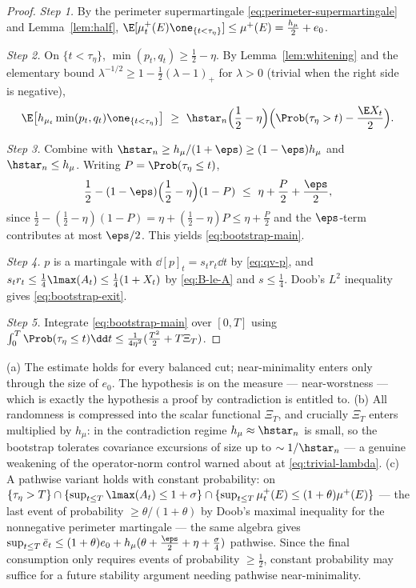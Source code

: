\documentclass[../../main.tex]{subfiles}
\begin{document}
\begin{proof}
\emph{Step 1.} By the perimeter supermartingale \eqref{eq:perimeter-supermartingale} and
Lemma~\ref{lem:half},
$\E[\mu_t^+(E)\one_{\{t<\tau_\eta\}}]\le\mu^+(E)=\tfrac{h_\mu}2+e_0$.

\emph{Step 2.} On $\{t<\tau_\eta\}$, $\min(p_t,q_t)\ge\tfrac12-\eta$. By
Lemma~\ref{lem:whitening} and the elementary bound
$\lambda^{-1/2}\ge1-\tfrac12(\lambda-1)_+$ for $\lambda>0$ (trivial when the right side is
negative),
\[
  \E\bigl[h_{\mu_t}\min(p_t,q_t)\one_{\{t<\tau_\eta\}}\bigr]
  \ \ge\
  \hstar_n\Bigl(\frac12-\eta\Bigr)\Bigl(\Prob(\tau_\eta>t)-\frac{\E X_t}2\Bigr).
\]

\emph{Step 3.} Combine with $\hstar_n\ge h_\mu/(1+\eps)\ge(1-\eps)h_\mu$ and
$\hstar_n\le h_\mu$. Writing $P=\Prob(\tau_\eta\le t)$,
\[
  \frac12-(1-\eps)\Bigl(\frac12-\eta\Bigr)(1-P)
  \ \le\ \eta+\frac P2+\frac\eps2 ,
\]
since $\tfrac12-(\tfrac12-\eta)(1-P)=\eta+(\tfrac12-\eta)P\le\eta+\tfrac P2$ and the
$\eps$-term contributes at most $\eps/2$. This yields \eqref{eq:bootstrap-main}.

\emph{Step 4.} $p$ is a martingale with $\dd[p]_t=s_tr_t\dd t$ by \eqref{eq:qv-p}, and
$s_tr_t\le\tfrac14\lmax(A_t)\le\tfrac14(1+X_t)$ by \eqref{eq:B-le-A} and $s\le\tfrac14$.
Doob's $L^2$ inequality gives \eqref{eq:bootstrap-exit}.

\emph{Step 5.} Integrate \eqref{eq:bootstrap-main} over $[0,T]$ using
$\int_0^T\Prob(\tau_\eta\le t)\dd t\le\tfrac1{4\eta^2}(\tfrac{T^2}2+T\Xi_T)$.
\end{proof}

\begin{remark}[Features]
\label{rem:bootstrap-features}
(a) The estimate holds for every balanced cut; near-minimality enters only through the size of
$e_0$. The hypothesis is on the measure --- near-worstness --- which is exactly the hypothesis a
proof by contradiction is entitled to. (b) All randomness is compressed into the scalar
functional $\Xi_T$, and crucially $\Xi_T$ enters multiplied by $h_\mu$: in the contradiction
regime $h_\mu\approx\hstar_n$ is small, so the bootstrap tolerates covariance excursions of
size up to $\sim1/\hstar_n$ --- a genuine weakening of the operator-norm control warned about
at \eqref{eq:trivial-lambda}. (c) A pathwise variant holds with constant probability: on
$\{\tau_\eta>T\}\cap\{\sup_{t\le T}\lmax(A_t)\le1+\sigma\}\cap\{\sup_{t\le T}\mu_t^+(E)\le
(1+\theta)\mu^+(E)\}$ --- the last event of probability $\ge\theta/(1+\theta)$ by Doob's
maximal inequality for the nonnegative perimeter martingale --- the same algebra gives
$\sup_{t\le T}\bar e_t\le(1+\theta)e_0+h_\mu(\theta+\tfrac\eps2+\eta+\tfrac\sigma4)$ pathwise.
Since the final consumption only requires events of probability $\ge\tfrac12$, constant
probability may suffice for a future stability argument needing pathwise near-minimality.
\end{remark}
\end{document}
